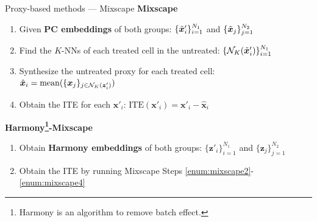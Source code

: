 \documentclass[10pt]{beamer}
\begin{document}
\begin{frame}{Proxy-based methods --- \normalsize Mixscape}
    \bigskip
    \textbf{Mixscape}\cite{papalexi_characterizing_2021}
    \begin{enumerate}
        \item Given \textbf{PC embeddings} of both groups: $\{\Tilde{\bm{x}}'_i\}_{i=1}^{N_1}$ and $\{\Tilde{\bm{x}}_j\}_{j=1}^{N_2}$
        \item Find the $K$-NNs of each treated cell in the untreated: $\{\mathcal{N}_K(\Tilde{\bm{x}}'_i)\}_{i=1}^{N_1}$\label{enum:mixscape2}
        \item Synthesize the untreated proxy for each treated cell: $\hat{\bm{x}}_i = \operatorname*{mean}(\{\bm{x}_j\}_{j\in\mathcal{N}_K(\bm{z}'_i)})$
        \item Obtain the ITE for each $\bm{x}'_i$: $\text{ITE}(\bm{x}'_i)=\bm{x}'_i - \hat{\bm{x}}_i$\label{enum:mixscape4}
    \end{enumerate}
    \bigskip
    
    \textbf{Harmony\footnote{Harmony\cite{korsunsky_fast_2019} is an algorithm to remove batch effect.}-Mixscape}
    \begin{enumerate}
        \item Obtain \textbf{Harmony embeddings} of both groups: $\{\bm{z}'_i\}_{i=1}^{N_1}$ and $\{\bm{z}_j\}_{j=1}^{N_2}$
        \item Obtain the ITE by running Mixscape Steps \ref{enum:mixscape2}-\ref{enum:mixscape4}
    \end{enumerate}
    
\end{frame}
\end{document}
